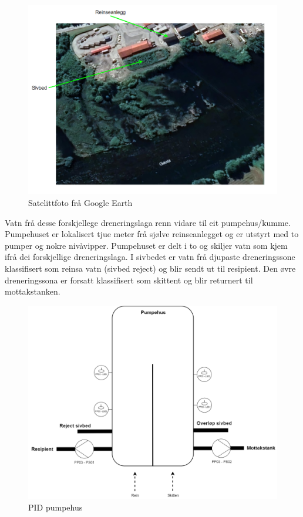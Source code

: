 \begin{figure}[htbp]
    \centering
    \includegraphics[width=1\textwidth]{Bilder/SatelittFoto.png}
    \caption{Satelittfoto frå Google Earth \citep{Google} }\label{fig:Sivbed}
\end{figure}

\newpage

Vatn frå desse forskjellege dreneringslaga renn vidare til eit pumpehus/kumme.
Pumpehuset er lokalisert tjue meter frå sjølve reinseanlegget og er utstyrt med to pumper og nokre nivåvipper.
Pumpehuset er delt i to og skiljer vatn som kjem ifrå dei forskjellige dreneringslaga.\newline
I sivbedet er vatn frå djupaste dreneringssone klassifisert som reinsa vatn (sivbed reject) og blir sendt ut til resipient.
Den øvre dreneringssona er forsatt klassifisert som skittent og blir returnert til mottakstanken. \newline \newline \newline \newline \newline

\begin{figure}[htbp]
    \centering
    \includegraphics[width=1\textwidth]{Figurar/Pumpehus.drawio.png}
    \caption{\gls{PID} pumpehus}\label{fig:Pumpehus}
\end{figure}

